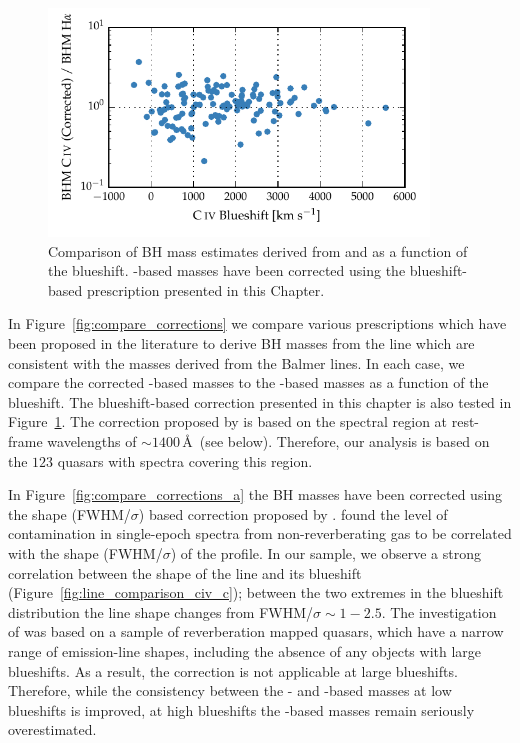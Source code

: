 \begin{figure}
    \centering 
    \includegraphics[width=0.9\textwidth]{figures/chapter03/corrections_coatman.pdf} 
    \caption[{Comparison of corrected -based BH masses and \hans-based masses as a function of the  blueshift.}]{Comparison of BH mass estimates derived from  and \ha as a function of the  blueshift. -based masses have been corrected using the  blueshift-based prescription presented in this Chapter.}
    \label{fig:compare_corrections_coatman}
\end{figure}

In Figure~\ref{fig:compare_corrections} we compare various prescriptions which have been proposed in the literature to derive BH masses from the  line which are consistent with the masses derived from the Balmer lines. 
In each case, we compare the corrected -based masses to the \hans-based masses as a function of the  blueshift. 
The  blueshift-based correction presented in this chapter is also tested in Figure~\ref{fig:compare_corrections_coatman}.
The correction proposed by \citet{runnoe13} is based on the spectral region at rest-frame wavelengths of $\sim$$1400$\,\AA\, (see below). 
Therefore, our analysis is based on the $123$ quasars with spectra covering this region. 

In Figure~\ref{fig:compare_corrections_a} the  BH masses have been corrected using the  shape (FWHM/$\sigma$) based correction proposed by \citet{denney12}. 
\citet{denney12} found the level of contamination in single-epoch spectra from non-reverberating gas to be correlated with the shape (FWHM/$\sigma$) of the  profile. 
In our sample, we observe a strong correlation between the shape of the  line and its blueshift (Figure~\ref{fig:line_comparison_civ_c}); between the two extremes in the  blueshift distribution the line shape changes from FWHM/$\sigma\sim1-2.5$. 
The investigation of \citet{denney12} was based on a sample of reverberation mapped quasars, which have a narrow range of  emission-line shapes, including the absence of any objects with large  blueshifts. 
As a result, the correction is not applicable at large  blueshifts. 
Therefore, while the consistency between the \hans- and -based masses at low  blueshifts is improved, at high  blueshifts the -based masses remain seriously overestimated.

